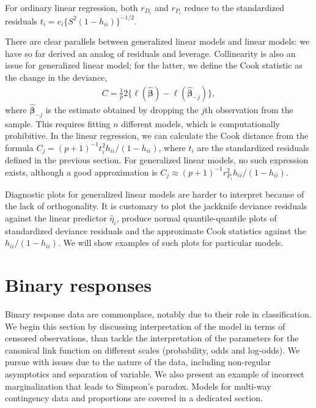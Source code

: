\documentclass[
  11pt,
  letterpaper,
]{book}
\theoremstyle{definition}
\theoremstyle{definition}
\theoremstyle{definition}
\theoremstyle{remark}
\begin{document}
For ordinary linear regression, both \(r_{D_i}\) and \(r_{P_i}\) reduce to the standardized residuals \(t_i=e_i\{S^2(1-h_{ii})\}^{-1/2}\).

There are clear parallels between generalized linear models and linear models: we have so far derived an analog of residuals and leverage. Collinearity is also an issue for generalized linear model; for the latter, we define the Cook statistic as the change in the deviance,
\begin{align*}
C = \frac{1}{p} 2\{\ell(\widehat{\boldsymbol{\beta}}) - \ell(\widehat{\boldsymbol{\beta}}_{-j})\},
\end{align*}
where \(\widehat{\boldsymbol{\beta}}_{-j}\) is the estimate obtained by dropping the \(j\)th observation from the sample. This requires fitting \(n\) different models, which is computationally prohibitive. In the linear regression, we can calculate the Cook distance from the formula \(C_j = (p+1)^{-1}t_i^2h_{ii}/(1-h_{ii})\), where \(t_i\) are the standardized residuals defined in the previous section. For generalized linear models, no such expression exists, although a good approximation is \(C_j \approx (p+1)^{-1}r_{P_i}^2h_{ii}/(1-h_{ii})\).

Diagnostic plots for generalized linear models are harder to interpret because of the lack of orthogonality. It is customary to plot the jackknife deviance residuals against the linear predictor \(\widehat{\eta}_i\), produce normal quantile-quantile plots of standardized deviance residuals and the approximate Cook statistics against the \(h_{ii}/(1-h_{ii})\). We will show examples of such plots for particular models.

\hypertarget{binary-responses}{%
\section{Binary responses}\label{binary-responses}}

Binary response data are commonplace, notably due to their role in classification. We begin this section by discussing interpretation of the model in terms of censored observations, than tackle the interpretation of the parameters for the canonical link function on different scales (probability, odds and log-odds). We pursue with issues due to the nature of the data, including non-regular asymptotics and separation of variable. We also present an example of incorrect marginalization that leads to Simpson's paradox. Models for multi-way contingency data and proportions are covered in a dedicated section.
\end{document}
